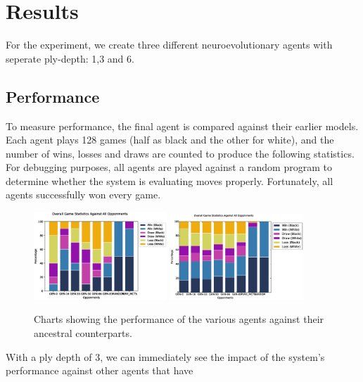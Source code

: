 \documentclass[12pt,a4paper]{article}
\begin{document}
\section{Results}

    For the experiment, we create three different neuroevolutionary agents with seperate ply-depth: 1,3 and 6. 
    
    \subsection{Performance}
    To measure performance, the final agent is compared against their earlier models. Each agent plays 128 games (half as black and the other for white), and the number of wins, losses and draws are counted to produce the following statistics. For debugging purposes, all agents are played against a random program to determine whether the system is evaluating moves properly. Fortunately, all agents successfully won every game.
    \begin{figure}[!h]
        \centering
        \includegraphics[width=50mm]{images/results/1ply/gm_net_stats.eps}
        \includegraphics[width=50mm]{images/results/3ply/gm_net_stats.eps}
        \caption{Charts showing the performance of the various agents against their ancestral counterparts.\label{net_stats}}
    \end{figure}
    
        With a ply depth of 3, we can immediately see the impact of the system's performance against other agents that have 
        
\end{document}
